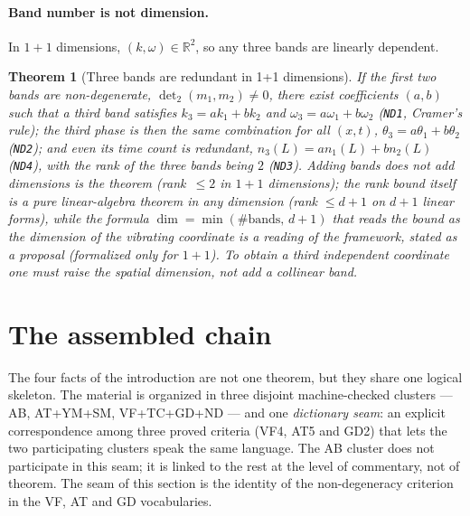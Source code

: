 \documentclass[aps,prd,preprint,superscriptaddress,amsmath,amssymb]{revtex4-2}
\newtheorem{theorem}{Theorem}[section]
\begin{document}
\paragraph{Band number is not dimension.}
In $1+1$ dimensions, $(k,\omega)\in\mathbb{R}^2$, so any three bands
are linearly dependent.

\begin{theorem}[Three bands are redundant in 1+1 dimensions]
\label{thm:nd}
If the first two bands are non-degenerate,
$\det\nolimits_2(m_1,m_2)\ne0$, there exist coefficients $(a,b)$
such that a third band satisfies $k_3=ak_1+bk_2$ and
$\omega_3=a\omega_1+b\omega_2$ (\texttt{ND1}, Cramer's rule); the third phase is then the same combination for all
$(x,t)$, $\theta_3=a\theta_1+b\theta_2$ (\texttt{ND2}); and even its
time count is redundant, $n_3(L)=an_1(L)+bn_2(L)$ (\texttt{ND4}),
with the rank of the three bands being $2$ (\texttt{ND3}).  \emph{Adding bands does
not add dimensions} is the theorem (rank~$\le2$ in $1+1$
dimensions); the rank bound itself is a pure linear-algebra theorem
in any dimension (rank $\le d+1$ on $d+1$ linear forms), while the
formula $\dim = \min(\#\text{bands},\,d+1)$ that reads the bound as
\emph{the dimension of the vibrating coordinate} is a reading of the
framework, stated
as a proposal (formalized only for $1+1$).  To obtain a third
independent coordinate one must raise the spatial dimension, not add
a collinear band.
\end{theorem}

\section{The assembled chain}
\label{sec:chain}

The four facts of the introduction are not one theorem, but they
share one logical skeleton.  The material is organized in three
disjoint machine-checked clusters --- {AB}, {AT+YM+SM},
{VF+TC+GD+ND} --- and one \emph{dictionary seam}: an explicit
correspondence among three proved criteria (VF4, AT5 and GD2)
that lets the two participating clusters speak the same language.  The {AB} cluster does
not participate in this seam; it is linked to the rest at the level
of commentary, not of theorem.  The seam of this section is the identity of the non-degeneracy
criterion in the VF, AT and GD vocabularies.
\end{document}
